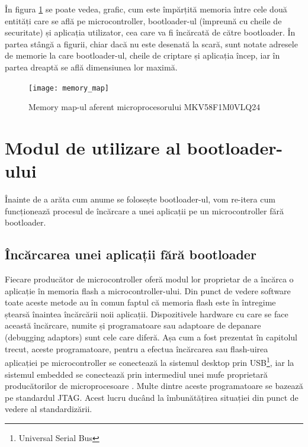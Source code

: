 \documentclass[12pt,a4paper,titlepage]{report}
\begin{document}
În figura \ref{memMap} se poate vedea, grafic, cum este împărțită memoria între cele două entități care se află pe microcontroller, bootloader-ul (împreună cu cheile de securitate) și aplicația utilizator, cea care va fi încărcată de către bootloader. În partea stângă a figurii, chiar dacă nu este desenată la scară, sunt notate adresele de memorie la care bootloader-ul, cheile de criptare și aplicația încep, iar în partea dreaptă se află dimensiunea lor maximă.

\begin{figure}[h]
    \centering
    \texttt{[image: memory\_map]}
    \caption{Memory map-ul aferent microprocesorului MKV58F1M0VLQ24}
    \label{memMap}
\end{figure}


\section{Modul de utilizare al bootloader-ului}

Înainte de a arăta cum anume se folosește bootloader-ul, vom re-itera cum funcționează procesul de încărcare a unei aplicații pe un microcontroller fără bootloader.

\subsection{Încărcarea unei aplicații fără bootloader}
Fiecare producător de microcontroller oferă modul lor proprietar de a încărca o aplicație în memoria flash a microcontroller-ului. Din punct de vedere software toate aceste metode au în comun faptul că memoria flash este în întregime ștearsă înaintea încărcării noii aplicații. Dispozitivele hardware cu care se face această încărcare, numite și programatoare sau adaptoare de depanare (debugging adaptors) sunt cele care diferă. Așa cum a fost prezentat în capitolul trecut, aceste programatoare, pentru a efectua încărcarea sau flash-uirea aplicației pe microcontroller se conectează la sistemul desktop prin USB\footnote{Universal Serial Bus}, iar la sistemul embedded se conectează prin intermediul unei mufe proprietară producătorilor de microprocesoare \cite{ulinkConnections}. Multe dintre aceste programatoare se bazează pe standardul JTAG. Acest lucru ducând la îmbunătățirea situației din punct de vedere al standardizării.
\end{document}
